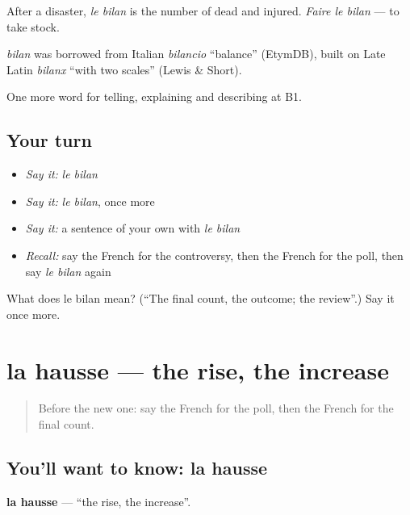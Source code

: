After a disaster, \emph{le bilan} is the number of dead and injured. \emph{Faire le bilan} — to take stock.

\begin{cousinweb}
\emph{bilan} was borrowed from Italian \emph{bilancio} \textquotedblleft{}balance\textquotedblright{} (EtymDB), built on Late Latin \emph{bilanx} \textquotedblleft{}with two scales\textquotedblright{} (Lewis \& Short).
\end{cousinweb}

\begin{grammarlens}[title={What you've built}]
One more word for telling, explaining and describing at B1.
\end{grammarlens}

\subsection*{Your turn}
\begin{itemize}
\raggedright
  \item \emph{Say it:} \emph{le bilan}
  \item \emph{Say it:} \emph{le bilan}, once more
  \item \emph{Say it:} a sentence of your own with \emph{le bilan}
  \item \emph{Recall:} say the French for the controversy, then the French for the poll, then say \emph{le bilan} again
\end{itemize}

\begin{tcolorbox}[breakable,colback=teal!4,colframe=teal!35!black,title={Before you move on}]
What does le bilan mean? (\textquotedblleft{}The final count, the outcome; the review\textquotedblright{}.) Say it once more.
\end{tcolorbox}
\section[la hausse]{la hausse — the rise, the increase}

\label{lesson:FR-C286-hausse}



\begin{quote}
Before the new one: say the French for the poll, then the French for the final count.
\end{quote}

\subsection*{You'll want to know: la hausse}
\textbf{la hausse} — \textquotedblleft{}the rise, the increase\textquotedblright{}.

